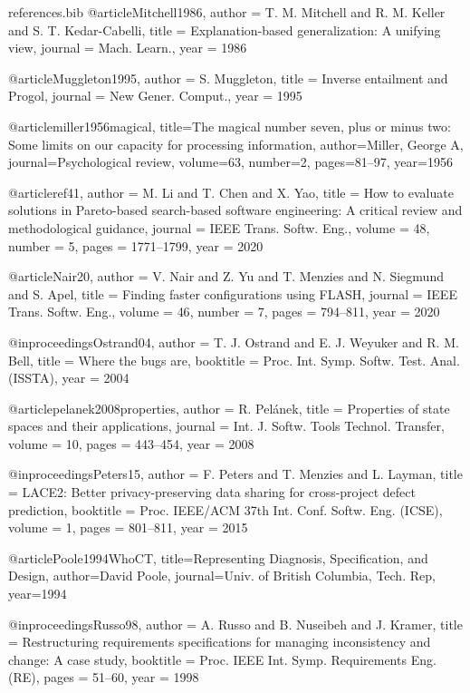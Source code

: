 \documentclass[runningheads]{llncs}
\begin{document}
\begin{filecontents}{references.bib}
@article{Mitchell1986,
  author  = {T. M. Mitchell and R. M. Keller and S. T. Kedar-Cabelli},
  title   = {Explanation-based generalization: A unifying view},
  journal = {Mach. Learn.},
  year    = {1986}
}

@article{Muggleton1995,
  author  = {S. Muggleton},
  title   = {Inverse entailment and Progol},
  journal = {New Gener. Comput.},
  year    = {1995}
}

@article{miller1956magical,
  title={The magical number seven, plus or minus two: Some limits on our capacity for processing information},
  author={Miller, George A},
  journal={Psychological review},
  volume={63},
  number={2},
  pages={81--97},
  year={1956}
}

@article{ref41,
  author  = {M. Li and T. Chen and X. Yao},
  title   = {How to evaluate solutions in Pareto-based search-based software engineering: A critical review and methodological guidance},
  journal = {IEEE Trans. Softw. Eng.},
  volume  = {48},
  number  = {5},
  pages   = {1771--1799},
  year    = {2020}
}


@article{Nair20,
  author  = {V. Nair and Z. Yu and T. Menzies and N. Siegmund and S. Apel},
  title   = {Finding faster configurations using FLASH},
  journal = {IEEE Trans. Softw. Eng.},
  volume  = {46},
  number  = {7},
  pages   = {794--811},
  year    = {2020}
}

@inproceedings{Ostrand04,
  author    = {T. J. Ostrand and E. J. Weyuker and R. M. Bell},
  title     = {Where the bugs are},
  booktitle = {Proc. Int. Symp. Softw. Test. Anal. (ISSTA)},
  year      = {2004}
}

@article{pelanek2008properties,
  author  = {R. Pel{\'a}nek},
  title   = {Properties of state spaces and their applications},
  journal = {Int. J. Softw. Tools Technol. Transfer},
  volume  = {10},
  pages   = {443--454},
  year    = {2008}
}

@inproceedings{Peters15,
  author    = {F. Peters and T. Menzies and L. Layman},
  title     = {LACE2: Better privacy-preserving data sharing for cross-project defect prediction},
  booktitle = {Proc. IEEE/ACM 37th Int. Conf. Softw. Eng. (ICSE)},
  volume    = {1},
  pages     = {801--811},
  year      = {2015}
}

@article{Poole1994WhoCT,
  title={Representing Diagnosis, Specification, and Design},
  author={David Poole}, journal={Univ. of British Columbia, Tech. Rep}, year={1994}
}

@inproceedings{Russo98,
  author    = {A. Russo and B. Nuseibeh and J. Kramer},
  title     = {Restructuring requirements specifications for managing inconsistency and change: A case study},
  booktitle = {Proc. IEEE Int. Symp. Requirements Eng. (RE)},
  pages     = {51--60},
  year      = {1998}
}


\end{filecontents}
\end{document}
